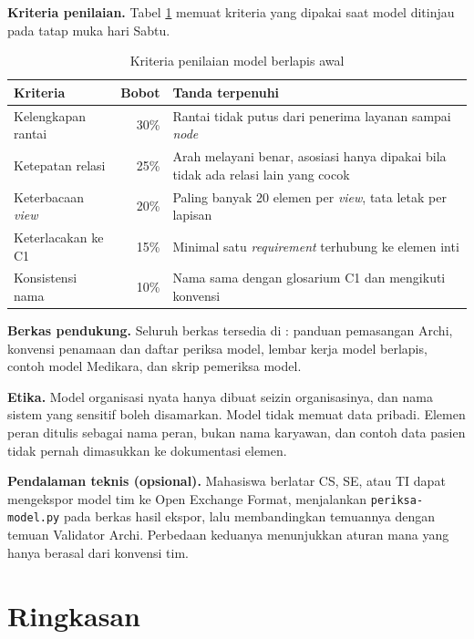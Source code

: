 \textbf{Kriteria penilaian.} Tabel \ref{tab:ch04-kriteria} memuat kriteria
yang dipakai saat model ditinjau pada tatap muka hari Sabtu.

\begin{table}[!htb]
  \centering
  \caption{Kriteria penilaian model berlapis awal}
  \label{tab:ch04-kriteria}
  \small
  \begin{tabularx}{\textwidth}{>{\raggedright\arraybackslash}p{3.6cm}rX}
    \hline
    \textbf{Kriteria} & \textbf{Bobot} & \textbf{Tanda terpenuhi} \\
    \hline
    Kelengkapan rantai & 30\% & Rantai tidak putus dari penerima layanan sampai \textit{node} \\
    \hline
    Ketepatan relasi & 25\% & Arah melayani benar, asosiasi hanya dipakai bila tidak ada relasi lain yang cocok \\
    \hline
    Keterbacaan \textit{view} & 20\% & Paling banyak 20 elemen per \textit{view}, tata letak per lapisan \\
    \hline
    Keterlacakan ke C1 & 15\% & Minimal satu \textit{requirement} terhubung ke elemen inti \\
    \hline
    Konsistensi nama & 10\% & Nama sama dengan glosarium C1 dan mengikuti konvensi \\
    \hline
  \end{tabularx}
\end{table}

\textbf{Berkas pendukung.} Seluruh berkas tersedia di
: panduan pemasangan Archi, konvensi penamaan dan
daftar periksa model, lembar kerja model berlapis, contoh model Medikara, dan
skrip pemeriksa model.

\textbf{Etika.} Model organisasi nyata hanya dibuat seizin organisasinya,
dan nama sistem yang sensitif boleh disamarkan. Model tidak memuat data
pribadi. Elemen peran ditulis sebagai nama peran, bukan nama karyawan, dan
contoh data pasien tidak pernah dimasukkan ke dokumentasi elemen.

\textbf{Pendalaman teknis (opsional).} Mahasiswa berlatar CS, SE, atau TI
dapat mengekspor model tim ke Open Exchange Format, menjalankan
\texttt{periksa-model.py} pada berkas hasil ekspor, lalu membandingkan
temuannya dengan temuan Validator Archi. Perbedaan keduanya menunjukkan
aturan mana yang hanya berasal dari konvensi tim.

\section{Ringkasan}

